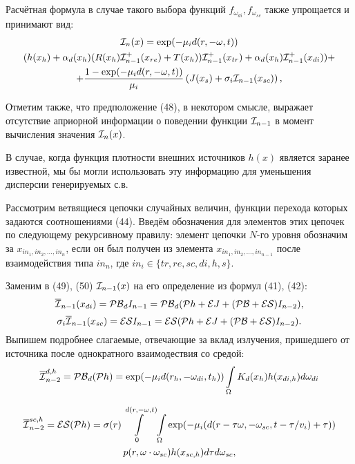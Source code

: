 \documentclass[12pt,reqno]{report}
\begin{document}
 Расчётная формула в случае такого выбора функций $f_{\omega_{di}}, f_{\omega_{sc}}$ 
также упрощается и принимают вид:
 \begin{multline}
{\cal I}_n(x) = \exp(-\mu_i d(r, -\omega, t)) 
\\ (h(x_h) +  \alpha_d(x_h)(R(x_h) {\cal I}_{n-1}^+
(x_{re}) + T(x_h) ) {\cal I}_{n-1}^+ (x_{tr}) + \alpha_d(x_h) {\cal I}_{n-1}^+ (x_{di})) +
\\ + \frac{1 - \exp(-\mu_i d(r, -\omega, t))}{\mu_i} \left(J(x_s) + \sigma_i {\cal I}_{n-1}(x_{sc})\right),
\end{multline}
{Отметим также, что предположение (48), в некотором смысле, 
выражает отсутствие априорной информации о поведении функции ${\cal I}_{n-1}$ 
в момент вычисления значения ${\cal I}_n(x)$.

В случае, когда функция плотности внешних источников $h(x)$ является заранее известной,
мы бы могли использовать эту информацию для уменьшения дисперсии генерируемых с.в.

Рассмотрим ветвящиеся цепочки случайных величин, функции перехода которых задаются соотношениями (44).
Введём обозначения для элементов этих цепочек по следующему рекурсивному правилу:
элемент цепочки $N$-го уровня обозначим за $x_{in_1,in_2, ..., in_n}$, 
если он был получен из элемента $x_{in_1,in_2, ..., in_{n-1}}$ после взаимодействия типа $in_n$,
где $in_i \in \{tr, re, sc, di, h, s\}$.

Заменим в (49), (50) ${\cal I}_{n-1}(x)$ на его определение из формул (41), (42):
\begin{equation}
{\overline{\cal I}_{n-1}(x_{di})} = 
{\cal PB}_{d} I_{n-1} = {\cal PB}_{d} (\mathcal{P} h + \mathcal E J + (\mathcal{PB} + \mathcal{ES}) I_{n-2}),
\end{equation}
\begin{equation}
{\sigma_i \overline{\cal I}_{n-1}(x_{sc})} = {\cal ES}I_{n-1} = 
{\cal ES} (\mathcal{P} h + \mathcal E J + (\mathcal{PB} + \mathcal{ES}) I_{n-2}).
\end{equation}
Выпишем подробнее слагаемые, отвечающие за вклад излучения, пришедшего от источника после однократного взаимодествия со средой:
\begin{equation}
{\overline{\cal I}_{n-2}^{d, h}} = {\cal PB}_{d} (\mathcal{P} h) =
\exp(- \mu_i d(r_h, -\omega_{di}, t_h))  \int\limits_{\Omega} K_d(x_h) h(x_{di, h})d\omega_{di}
\end{equation}

\begin{multline}
{\overline{\cal I}_{n-2}^{sc, h}} = {\cal ES} (\mathcal{P} h) = 
\sigma(r) \int \limits^{d(r,-\omega,t)}_0 \int\limits_{\Omega} \exp(- \mu_i (d(r-\tau\omega, -\omega_{sc}, t-\tau/v_i) + \tau)) \\ 
p(r,\omega \cdot\omega_{sc}) h(x_{sc, h})d\tau d\omega_{sc},
\end{multline}

}
\end{document}
